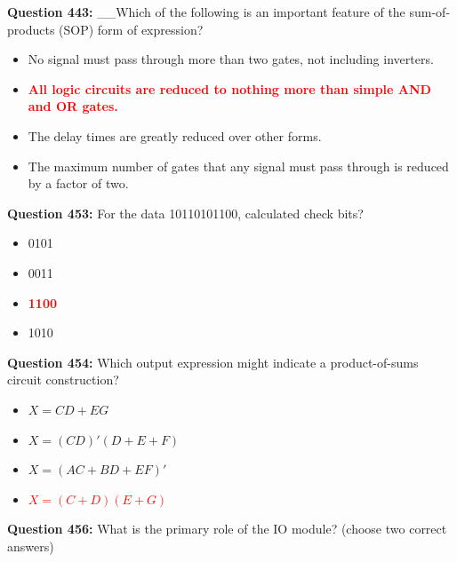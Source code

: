 \documentclass[12pt,a4paper]{article}
\begin{document}
\vspace{0.5cm}

\textbf{Question 443:} __Which of the following is an important feature of the sum-of-products (SOP) form of expression?

\begin{itemize}
    \item[\textbf{A.}] No signal must pass through more than two gates, not including inverters.
    \item[\textbf{B.}] \textcolor{red}{\textbf{All logic circuits are reduced to nothing more than simple AND and OR gates.}}
    \item[\textbf{C.}] The delay times are greatly reduced over other forms.
    \item[\textbf{D.}] The maximum number of gates that any signal must pass through is reduced by a factor of two.
\end{itemize}

\vspace{0.5cm}

\textbf{Question 453:} For the data 10110101100, calculated check bits?

\begin{itemize}
    \item[\textbf{A.}] 0101
    \item[\textbf{B.}] 0011
    \item[\textbf{C.}] \textcolor{red}{\textbf{1100}}
    \item[\textbf{D.}] 1010
\end{itemize}

\vspace{0.5cm}

\textbf{Question 454:} Which output expression might indicate a product-of-sums circuit construction?

\begin{itemize}
    \item[\textbf{A.}] $X = CD + EG$
    \item[\textbf{B.}] $X = (CD)'(D + E + F)$
    \item[\textbf{C.}] $X = (AC + BD + EF)'$
    \item[\textbf{D.}] \textcolor{red}{\textbf{$X = (C + D)(E + G)$}}
\end{itemize}

\vspace{0.5cm}

\textbf{Question 456:} What is the primary role of the IO module? (choose two correct answers)
\end{document}
